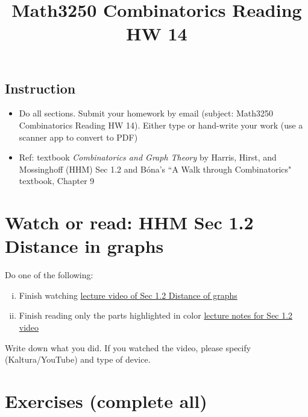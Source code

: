 \documentclass[10pt]{amsart}
\title{Math3250 Combinatorics Reading HW 14}
\begin{document}
\maketitle



\subsection*{Instruction}

\begin{itemize}
\item Do all sections.
Submit your homework by email (subject: Math3250 Combinatorics Reading HW 14). Either type or hand-write your work (use a scanner app to convert to PDF)
\item
Ref: textbook \emph{Combinatorics and Graph Theory} by Harris, Hirst, and Mossinghoff (HHM) Sec 1.2 and 
 B\'ona's ``A Walk through Combinatorics" textbook, Chapter 9
\end{itemize}






\section{Watch or read: HHM Sec 1.2  Distance in graphs}

Do one of the following:
\begin{enumerate}[i.]
	\item Finish watching \href{}{lecture video of Sec 1.2 Distance of graphs} 
	\item Finish reading only the parts highlighted in color  \href{https://egunawan.github.io/combinatorics/notes/notes1_2distance_in_graphs.pdf}{lecture notes for Sec 1.2 video}
\end{enumerate}

Write down what you did. If you watched the video, please specify (Kaltura/YouTube) and type of device.


\section{Exercises (complete all)}
\end{document}
